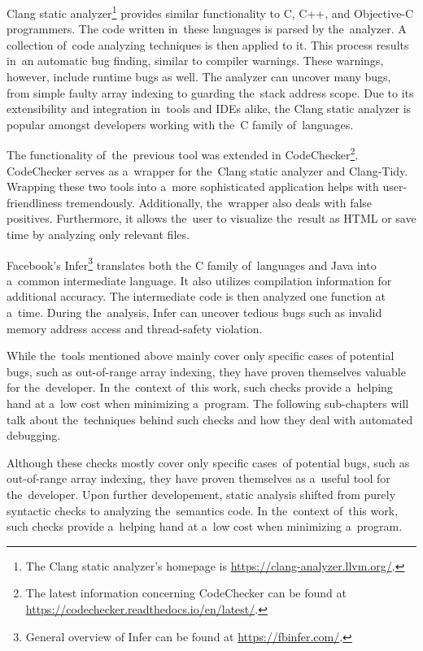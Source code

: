 Clang static analyzer\footnote{The Clang static analyzer's 
homepage is \url{https://clang-analyzer.llvm.org/}.} provides 
similar functionality to C, C++, and 
Ob\-jec\-tive-C programmers.
The code written in~these languages is parsed by the~ana\-ly\-zer.
A collection of~code analyzing techniques is then applied to it.
This process results in~an automatic bug finding, similar to compiler 
warnings.
These war\-nings, however, include runtime bugs as well.
The analyzer can uncover many bugs, from simple faulty array 
indexing to guarding the~stack address scope.
Due to its extensibility and integration in~tools and IDEs alike, 
the Clang static analyzer is popular amongst developers working 
with the~C family of~languages.

The functionality of~the~previous tool was extended 
in CodeChecker\footnote{The latest information concerning CodeChecker
can be found at \url{https://codechecker.readthedocs.io/en/latest/}.}.
Code\-Check\-er serves as a~wrapper for the~Clang static analyzer and 
Clang-Tidy.
Wrapping these two tools into a~more sophisticated application helps 
with user-friend\-li\-ness tremendously.
Additionally, the~wrapper also deals with false positives.
Furthermore, it allows the~user to visualize the~result as HTML or 
save time by analyzing only relevant files.

Facebook's Infer\footnote{General overview of Infer can be found at 
\url{https://fbinfer.com/}.} translates both 
the C family of~languages and Java 
into a~common intermediate language.
It also utilizes compilation information for add\-itional accuracy.
The intermediate code is then analyzed one function at a~time.
During the~analysis, Infer can uncover tedious bugs such as invalid 
memory address access and thread-safety violation.

While the~tools mentioned above mainly cover only specific cases 
of potential bugs, such as out-of-range array indexing, they 
have proven themselves valuable for the~developer.
In the~context of~this work, such checks provide a~helping hand 
at a~low cost when minimizing a~program.
The following sub-chapters will talk about the~techniques behind 
such checks and how they deal with automated debugging.

Although these checks mostly cover only specific 
cases~of potential bugs, such as out-of-range array indexing, they have proven 
themselves as a~useful tool for the~developer.
Upon further developement, static analysis shifted from purely syntactic
checks to analyzing the~semantics code.
In the~context of~this work, such checks provide a~helping hand 
at a~low cost when minimizing a~program. 

